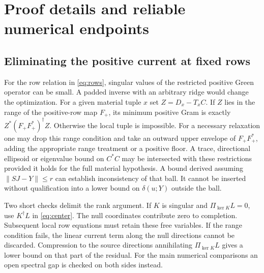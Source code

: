 \section{Proof details and reliable numerical endpoints}\label{app:tech}

\subsection*{Eliminating the positive current at fixed rows}

For the row relation in \eqref{eq:rows}, singular values of the restricted positive Green operator can be small. A padded inverse with an arbitrary ridge would change the optimization. For a given material tuple $x$ set $Z=D_x-T_x C$. If $Z$ lies in the range of the positive-row map $F_+$, its minimum positive Gram is exactly $Z^*(F_+F_+^*)^\dagger Z$. Otherwise the local tuple is impossible. For a necessary relaxation one may drop this range condition and take an outward upper envelope of $F_+F_+^*$, adding the appropriate range treatment or a positive floor. A trace, directional ellipsoid or eigenvalue bound on $C^*C$ may be intersected with these restrictions provided it holds for the full material hypothesis. A bound derived assuming $\|SJ-Y\|\le r$ can establish inconsistency of that ball. It cannot be inserted without qualification into a lower bound on $\delta(u;Y)$ outside the ball.

Two short checks delimit the rank argument. If $K$ is singular and $\Pi_{\ker K}L=0$, use $K^\dagger L$ in \eqref{eq:center}. The null coordinates contribute zero to completion. Subsequent local row equations must retain these free variables. If the range condition fails, the linear current term along the null directions cannot be discarded. Compression to the source directions annihilating $\Pi_{\ker K}L$ gives a lower bound on that part of the residual. For the main numerical comparisons an open spectral gap is checked on both sides instead.

